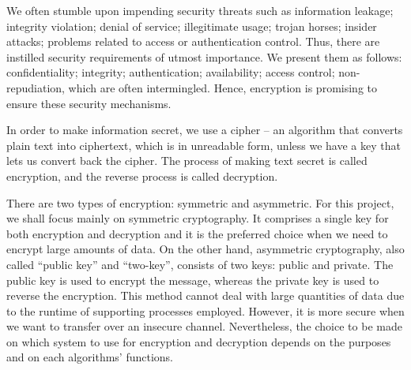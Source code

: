 We often stumble upon impending security threats such as information leakage; integrity violation; denial of service; illegitimate usage; trojan horses; insider attacks; problems related to access or authentication control. 
Thus, there are instilled security requirements of utmost importance. We present them as follows: confidentiality; integrity; authentication; availability; access control; non-repudiation, which are often intermingled. Hence, encryption is promising to ensure these security mechanisms. 

In order to make information secret, we use a cipher – an algorithm that converts plain text into ciphertext, which is in unreadable form, unless we have a key that lets us convert back the cipher. The process of making text secret is called encryption, and the reverse process is called decryption.

There are two types of encryption: symmetric and asymmetric. For this project, we shall focus mainly on symmetric cryptography. It comprises a single key for both encryption and decryption and it is the preferred choice when we need to encrypt large amounts of data. On the other hand, asymmetric cryptography, also called “public key” and “two-key”, consists of two keys: public and private. The public key is used to encrypt the message, whereas the private key is used to reverse the encryption. This method cannot deal with large quantities of data due to the runtime of supporting processes employed. However, it is more secure when we want to transfer over an insecure channel. Nevertheless, the choice to be made on which system to use for encryption and decryption depends on the purposes and on each algorithms’ functions. 
